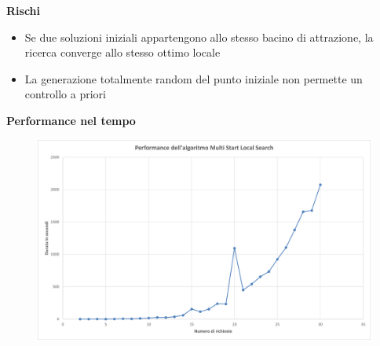 \documentclass[9pt]{beamer}
\begin{document}
\begin{frame}[allowframebreaks]{\subsecname}
\framebreak

	\textbf{Rischi}
	\begin{itemize}
		\item
		Se due soluzioni iniziali appartengono allo stesso bacino di attrazione, la ricerca converge allo stesso ottimo locale
		\item
		La generazione totalmente random del punto iniziale non permette un controllo a priori
	\end{itemize}

\framebreak

	\textbf{Performance nel tempo}
      	\begin{figure}[h]
	\centering
	\includegraphics[width=\textwidth]
	{../charts/14 Performance dell'algoritmo Multi Start Local Search}
	\end{figure}

\end{frame}

\end{document}
